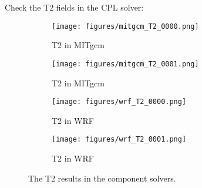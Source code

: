 
Check the T2 fields in the CPL solver:

\begin{figure}[h!]
\centering
  \begin{subfigure}[b]{0.45\linewidth}
  \texttt{[image: figures/mitgcm\_T2\_0000.png]}
  \caption{T2 in MITgcm}
  \end{subfigure}
  \begin{subfigure}[b]{0.45\linewidth}
  \texttt{[image: figures/mitgcm\_T2\_0001.png]}
  \caption{T2 in MITgcm}
  \end{subfigure}
  \hspace{0.1in}
  \begin{subfigure}[b]{0.45\linewidth}
  \texttt{[image: figures/wrf\_T2\_0000.png]}
  \caption{T2 in WRF}
  \end{subfigure}
  \begin{subfigure}[b]{0.45\linewidth}
  \texttt{[image: figures/wrf\_T2\_0001.png]}
  \caption{T2 in WRF}
  \end{subfigure}
\caption{The T2 results in the component solvers.}
\label{fig:t2}
\end{figure}
